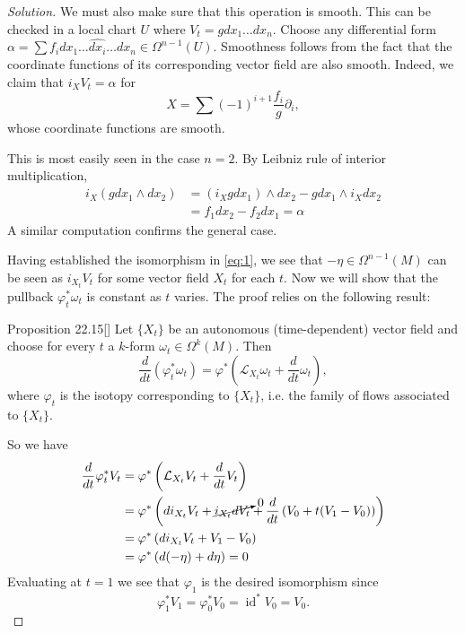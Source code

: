 \begin{proof}[Solution]
We must also make sure that this operation is smooth. This can be checked in a local chart $U$ where $V_t=gdx_1\ldots dx_n$. Choose any differential form $\alpha=\sum f_idx_1\ldots\widehat{dx_i}\ldots dx_n\in\Omega^{n-1}(U)$. Smoothness follows from the fact that the coordinate functions of its corresponding vector field are also smooth. Indeed, we claim that $i_XV_t=\alpha$ for
\[X=\sum (-1)^{i+1}\frac{f_i}{g}\partial_i,\]
whose coordinate functions are smooth.

This is most easily seen in the case $n=2$. By Leibniz rule of interior multiplication,
\begin{align*}
i_X(gdx_1\wedge dx_2)&=(i_Xgdx_1)\wedge dx_2-gdx_1\wedge i_Xdx_2\\
&=f_1 dx_2- f_2 dx_1=\alpha
\end{align*}
A similar computation confirms the general case.

Having established the isomorphism in \cref{eq:1}, we see that $-\eta \in \Omega^{n-1}(M)$ can be seen as $i_{X_t}V_t$ for some vector field $X_t$ for each  $t$. Now we will show that the pullback $\varphi^*_t \omega_t$ is constant as $t$ varies. The proof relies on the following result: 

\begin{thing4}{Proposition 22.15}[\cite{lee}]\leavevmode
	Let $\{X_t\}$ be an autonomous (time-dependent) vector field and choose for every $t$ a $k$-form $\omega_t \in \Omega^{k}(M)$. Then
	\[\frac{d}{dt}(\varphi^* _t \omega_t)=\varphi^*\left( \mathcal{L}_{X_t}\omega_t+\frac{d}{dt}\omega_t \right),\]
	where $\varphi_t$ is the isotopy corresponding to $\{X_t\}$, i.e. the family of flows associated to $\{X_t\}$.
\end{thing4}
So we have
\begin{align*}
\frac{d}{dt}\varphi^*_tV_t&=\varphi^*\left( \mathcal{L}_{X_t}V_t+\frac{d}{dt}V_t \right)\\
&=\varphi^*\left( di_{X_t}V_t+\cancelto{0}{i_{X_t}dV_t}+\frac{d}{dt}\left( V_0+t(V_1-V_0) \right)\right)\\
&=\varphi^*\left( di_{X_t}V_t+V_1-V_0 \right)\\
&=\varphi^*\left(   d(-\eta)+d\eta\right)=0
\end{align*}
Evaluating at $t=1$ we see that $\varphi_1$ is the desired isomorphism since
\[\varphi_1^*V_1=\varphi^*_0V_0=\operatorname{id}^*V_0=V_0.\]

\end{proof}
